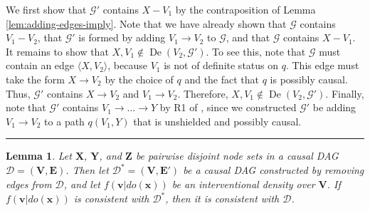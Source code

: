 \documentclass[twoside]{article}
\newtheorem{lemma}[theorem]{Lemma}
\DeclareMathOperator{\De}{De}
\newcommand{\mb}[1]{\mathbf{#1}}
\newcommand{\g}[1][G]{\mathcal{#1}}
\newenvironment{proofof}[1][]{\begin{trivlist}
\item[\hskip \labelsep {\bfseries Proof of #1.}]}{\hfill\BlackBox\end{trivlist}}
\newcommand{\BlackBox}{\rule{1.5ex}{1.5ex}}
\begin{document}
\begin{proofof}[Lemma \ref{lem:twopaths-corrollary}]
    We first show that $\g'$ contains $X - V_1$ by the contraposition of Lemma \ref{lem:adding-edges-imply}. Note that we have already shown that $\g$ contains $V_1 - V_2$, that $\g'$ is formed by adding $V_1 \to V_2$ to $\g$, and that $\g$ contains $X - V_1$. It remains to show that $X,V_1 \notin \De(V_2, \g')$. To see this, note that $\g$ must contain an edge $\langle X,V_2 \rangle$, because $V_1$ is not of definite status on $q$. This edge must take the form $X \to V_2$ by the choice of $q$ and the fact that $q$ is possibly causal. Thus, $\g'$ contains $X \to V_2$ and $V_1 \to V_2$. Therefore, $X,V_1 \notin \De(V_2, \g')$. Finally, note that $\g'$ contains $V_1 \to \dots \to Y$ by R1 of \cite{meek1995causal}, since we constructed $\g'$ be adding $V_1 \to V_2$ to a path $q(V_1,Y)$ that is unshielded and possibly causal.
\end{proofof}


\begin{lemma}
\label{lem:markov-sub}
    Let $\mb{X}$, $\mb{Y}$, and $\mb{Z}$ be pairwise disjoint node sets in a causal DAG $\g[D] = (\mb{V},\mb{E})$. Then let $\g[D]^* = (\mb{V},\mb{E'})$ be a causal DAG constructed by removing edges from $\g[D]$, and let $f(\mb{v} | do(\mb{x}))$ be an interventional density over $\mb{V}$. If $f(\mb{v} | do(\mb{x}))$ is consistent with $\g[D]^*$, then it is consistent with $\g[D]$.
\end{lemma}
\end{document}
